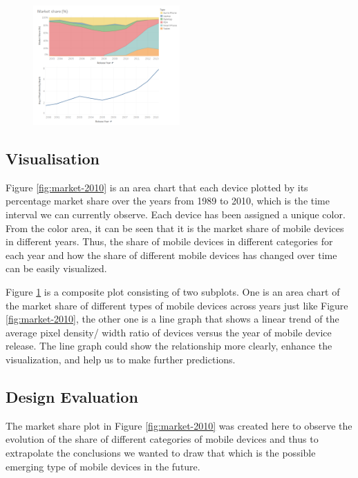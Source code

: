 \documentclass[conference]{IEEEtran}
\begin{document}
\begin{figure}
    \centering
    \includegraphics[width=0.5\textwidth]{../Visualisations/C/Piexel density.png}
    \caption{}
    \label{fig:pixel}
\end{figure}


\subsection{Visualisation}
Figure \ref{fig:market-2010} is an area chart that each device plotted by its percentage market share over the years from 1989 to 2010, which is the time interval we can currently observe. Each device has been assigned a unique color. From the color area, it can be seen that it is the market share of mobile devices in different years. Thus, the share of mobile devices in different categories for each year and how the share of different mobile devices has changed over time can be easily visualized.

Figure \ref{fig:pixel} is a composite plot consisting of two subplots. One is an area chart of the market share of different types of mobile devices across years just like Figure \ref{fig:market-2010}, the other one is a line graph that shows a linear trend of the average pixel density/ width ratio of devices versus the year of mobile device release. The line graph could show the relationship more clearly, enhance the visualization, and help us to make further predictions.

\subsection{Design Evaluation}
The market share plot in Figure \ref{fig:market-2010} was created here to observe the evolution of the share of different categories of mobile devices and thus to extrapolate the conclusions we wanted to draw that which is the possible emerging type of mobile devices in the future.
\end{document}
